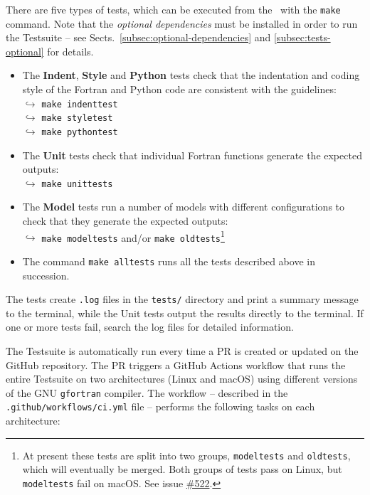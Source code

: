 There are five types of tests, which can be executed from the \maindir\ with the \verb|make|
command. Note that the \emph{optional dependencies} must be installed in order to run the
Testsuite -- see Sects.~\ref{subsec:optional-dependencies} and \ref{subsec:tests-optional} for
details.

\begin{itemize}
\item The \textbf{Indent}, \textbf{Style} and \textbf{Python} tests check that the indentation
  and coding style of the Fortran and Python code are consistent with the guidelines:\\
  $\hookrightarrow$ \verb|make indenttest|\\
  $\hookrightarrow$ \verb|make styletest|\\
  $\hookrightarrow$ \verb|make pythontest|
\item The \textbf{Unit} tests check that individual Fortran functions generate the expected
  outputs:\\
  $\hookrightarrow$ \verb|make unittests|
\item The \textbf{Model} tests run a number of models with different configurations to check
  that they generate the expected outputs:\\
  $\hookrightarrow$ \verb|make modeltests| and/or \verb|make oldtests|\footnote{At present
    these tests are split into two groups, \texttt{modeltests} and \texttt{oldtests}, which
    will eventually be merged. Both groups of tests pass on Linux, but \texttt{modeltests} fail
    on macOS. See issue \href{https://github.com/AtChem/AtChem2/issues/522}{\#522}.}
\item The command \verb|make alltests| runs all the tests described above in succession.
\end{itemize}

The tests create \texttt{.log} files in the \texttt{tests/} directory and print a summary
message to the terminal, while the Unit tests output the results directly to the terminal. If
one or more tests fail, search the log files for detailed information.

The Testsuite is automatically run every time a PR is created or updated on the GitHub
repository. The PR triggers a GitHub Actions workflow that runs the entire Testsuite on two
architectures (Linux and macOS) using different versions of the GNU \texttt{gfortran}
compiler. The workflow -- described in the \texttt{.github/workflows/ci.yml} file -- performs
the following tasks on each architecture:

